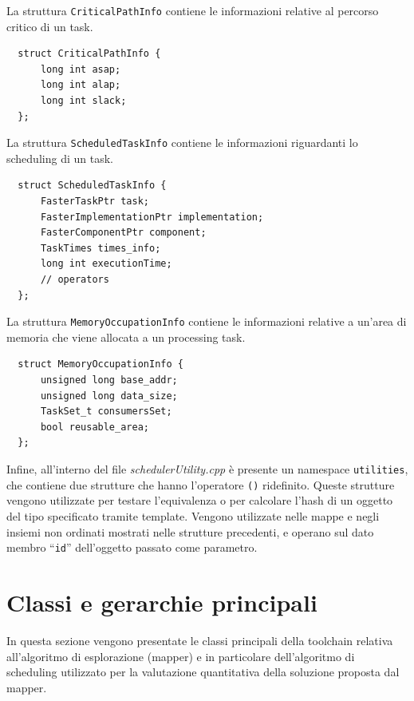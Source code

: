 La struttura \verb+CriticalPathInfo+ contiene le informazioni relative al 
percorso critico di un task.
\newline
\begin{verbatim}
  struct CriticalPathInfo {
      long int asap;
      long int alap;
      long int slack;
  };
\end{verbatim}

La struttura \verb+ScheduledTaskInfo+ contiene le informazioni riguardanti lo 
scheduling di un task.
\newline
\begin{verbatim}
  struct ScheduledTaskInfo {
      FasterTaskPtr task;
      FasterImplementationPtr implementation;
      FasterComponentPtr component;
      TaskTimes times_info;
      long int executionTime;
      // operators
  };
\end{verbatim}

La struttura \verb+MemoryOccupationInfo+ contiene le informazioni relative a 
un'area di memoria che viene allocata a un processing task.
\newline
\begin{verbatim}
  struct MemoryOccupationInfo {
      unsigned long base_addr;
      unsigned long data_size;
      TaskSet_t consumersSet;
      bool reusable_area;
  };
\end{verbatim}

Infine, all'interno del file \emph{schedulerUtility.cpp} è presente un 
namespace \verb+utilities+, che contiene due strutture che hanno l'operatore 
\verb+()+ ridefinito. Queste strutture vengono utilizzate per testare 
l'equivalenza o per calcolare l'hash di un oggetto del tipo specificato tramite 
template. Vengono utilizzate nelle mappe e negli insiemi non ordinati mostrati 
nelle strutture precedenti, e operano sul dato membro ``\verb+id+'' 
dell'oggetto passato come parametro.


\section{Classi e gerarchie principali}
\label{sec:classiGerarchie}
In questa sezione vengono presentate le classi principali della toolchain 
relativa all'algoritmo di esplorazione (mapper) e in particolare 
dell'algoritmo di scheduling utilizzato per la valutazione quantitativa della 
soluzione proposta dal mapper.

